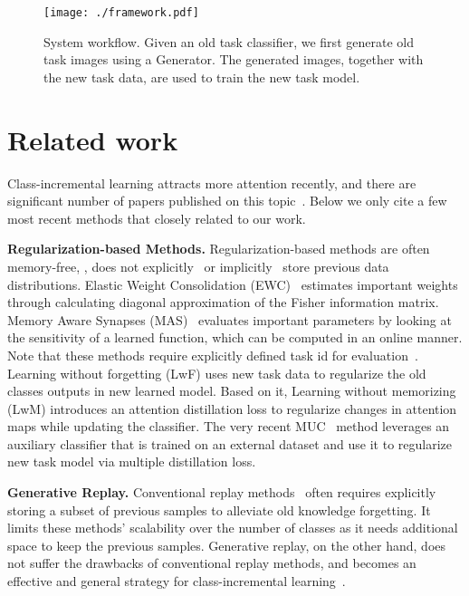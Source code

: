 \documentclass[10pt,twocolumn,letterpaper]{article}
\begin{document}
\begin{figure}[t]
\begin{center}
 \texttt{[image: ./framework.pdf]}
 \end{center}
 \vspace{-5mm}
\caption{\small{System workflow. Given an old task classifier, we first generate old task images using a Generator. The generated images, together with the new task data, are used to train the new task model.}}
\label{framework}
\vspace{-5mm}
\end{figure}

\section{Related work}
Class-incremental learning attracts more attention recently, and there are significant number of papers published on this topic~\cite{9349197}. Below we only cite a few most recent methods that closely related to our work. 

\textbf{Regularization-based Methods.}
Regularization-based methods are often memory-free, \ie, does not explicitly~\cite{rebuffi2017icarl,hou2019learning,liu2020mnemonics} or implicitly~\cite{shin2017continual,xiang2019incremental,lesort2019generative} store previous data distributions. Elastic Weight Consolidation (EWC)~\cite{kirkpatrick2017overcoming} estimates important weights through calculating diagonal approximation of the Fisher information matrix. Memory Aware Synapses (MAS)~\cite{aljundi2018memory} evaluates important parameters by looking at the sensitivity of a learned function, which can be computed in an online manner. Note that these methods require explicitly defined task id for evaluation~\cite{chaudhry2018riemannian}. Learning without forgetting (LwF) \cite{li2017learning} uses new task data to regularize the old classes outputs in new learned model. Based on it, Learning without memorizing (LwM)
\cite{dhar2019learning} introduces an attention distillation loss to regularize changes in attention maps while updating the classifier. The very recent MUC~\cite{liumore} method leverages an auxiliary classifier that is trained on an external dataset and use it to regularize new task model via multiple distillation loss. 

\textbf{Generative Replay.}
Conventional replay methods~\cite{rebuffi2017icarl} often requires explicitly storing a subset of previous samples to alleviate old knowledge forgetting. 
It limits these methods' scalability over the number of classes as it needs additional space to keep the previous samples.
Generative replay, on the other hand, does not suffer the drawbacks of conventional replay methods, and becomes an effective and general strategy for class-incremental learning~\cite{xiang2019incremental,Cong2020}. 
\end{document}
